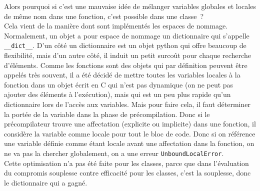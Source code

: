     Alors pourquoi si c'est une mauvaise idée de mélanger variables globales
et locales de même nom dans une fonction, c'est possible dans une
classe~?\\

Cela vient de la manière dont sont implémentés les espaces de nommage.
Normalement, un objet a pour espace de nommage un dictionnaire qui
s'appelle \texttt{\_\_dict\_\_}. D'un côté un dictionnaire est un objet
python qui offre beaucoup de flexibilité, mais d'un autre côté, il
induit un petit surcoût pour chaque recherche d'éléments. Comme les
fonctions sont des objets qui par définition peuvent être appelés très
souvent, il a été décidé de mettre toutes les variables locales à la
fonction dans un objet écrit en C qui n'est pas dynamique (on ne peut
pas ajouter des éléments à l'exécution), mais qui est un peu plus rapide
qu'un dictionnaire lors de l'accès aux variables. Mais pour faire cela,
il faut déterminer la portée de la variable dans la phase de
précompilation. Donc si le précompilateur trouve une affectation
(explicite ou implicite) dans une fonction, il considère la variable
comme locale pour tout le bloc de code. Donc si on référence une
variable définie comme étant locale avant une affectation dans la
fonction, on ne va pas la chercher globalement, on a une erreur
\texttt{UnboundLocalError}.\\

Cette optimisation n'a pas été faite pour les classes, parce que dans
l'évaluation du compromis souplesse contre efficacité pour les classes,
c'est la souplesse, donc le dictionnaire qui a gagné.
